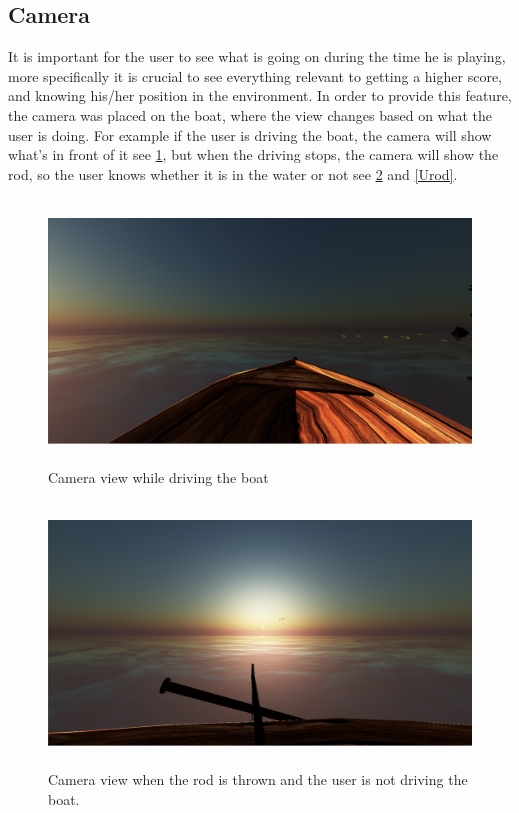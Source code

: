 \documentclass[paper=a4, fontsize=11pt]{scrartcl} %
\numberwithin{equation}{section} %
\numberwithin{figure}{section} %
\numberwithin{table}{section} %
\begin{document}
\subsection{Camera}

It is important for the user to see what is going on during the time he is playing, more specifically it is crucial to see everything relevant to getting a higher score, and knowing his/her position in the environment. In order to provide this feature, the camera was placed on the boat, where the view changes based on what the user is doing. For example if the user is driving the boat, the camera will show what's in front of it see \ref{boat view}, but when the driving stops, the camera will show the rod, so the user knows whether it is in the water or not see \ref{Drod} and \ref{Urod}.

\begin{figure}[!ht]
\centering
\includegraphics[width=15cm, height=7cm]{images/boatview.png}
\caption{Camera view while driving the boat}
\label{boat view}
\end{figure}

\begin{figure}[!ht]
\centering
\includegraphics[width=15cm, height=7cm]{images/thrownrod.png}
\caption{Camera view when the rod is thrown and the user is not driving the boat.}
\label{Drod}
\end{figure}
\end{document}
